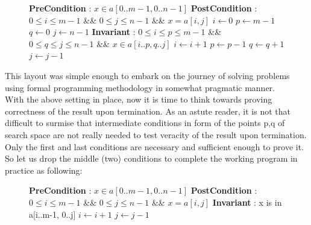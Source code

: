 \begin{figure}[H]
\begin{center}
\end{center}
\begin{algorithmic}[1]
\State \textbf{PreCondition}{ : $x \in a[0..m-1, 0..n-1]$}
\State \textbf{PostCondition}{ : $0 \leq i \leq m-1$ \&\& $0 \leq j \leq n-1$ \&\& $x = a[i, j]$}
    \State $i \gets 0$
    \State $p \gets m - 1$
    \State $q \gets 0$
    \State $j \gets n - 1$
  \State \textbf{Invariant}{ : $0 \leq i \leq p \leq m-1$ \&\& $0 \leq q \leq j \leq n-1$ \&\& $x \in a[i..p, q..j]$}\vspace{1mm}     
        \State  $i \longleftarrow i + 1$
    \EndIf
        \State  $p \longleftarrow p - 1$
    \EndIf
        \State  $q \longleftarrow q + 1$
    \EndIf
        \State  $j \longleftarrow j - 1$
    \EndIf
   \EndWhile
\EndFunction
\end{algorithmic}
\end{figure}


This layout was simple enough to embark on the journey of solving problems using formal programming methodology in somewhat pragmatic manner. 
\vspace{1mm}\\
With the above setting in place, now it is time to think towards proving correctness of the result upon termination. As an astute reader, it is not that difficult to surmise that intermediate conditions in form of the points p,q of search space are not really needed to test veracity of the result upon termination. Only the first and last conditions are necessary and sufficient enough to prove it. So let us drop the middle (two) conditions to complete the working program in practice as following:

\begin{figure}[H]
\begin{center}
\end{center}
\begin{algorithmic}[1]
\State \textbf{PreCondition}{ : $x \in a[0..m-1, 0..n-1]$}
\State \textbf{PostCondition}{ : $0 \leq i \leq m-1$ \&\& $0 \leq j \leq n-1$ \&\& $x = a[i, j]$}
\State \textbf{Invariant}{ : x is in a[i..m-1, 0..j]}
                \State $i \gets i + 1$
                \Else $j \gets j - 1$
            \EndIf
        \EndWhile
\EndFunction
\end{algorithmic}
\end{figure}

